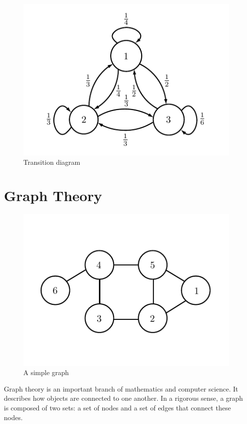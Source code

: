 \begin{figure}[h!]
\begin{center}
\includegraphics[scale = 1]{markov2}
\end{center}
\caption{Transition diagram}
\label{markov2}
\end{figure}

\newpage

\section*{Graph Theory}
\begin{figure}[h!]
\includegraphics[scale = .8]{graphExample}
\caption{A simple graph}
\label{markov:example_graph}
\end{figure}

Graph theory is an important branch of mathematics and computer science.
It describes how objects are connected to one another.
In a rigorous sense, a graph is composed of two sets: a set of nodes and a set of edges that connect these nodes. 


